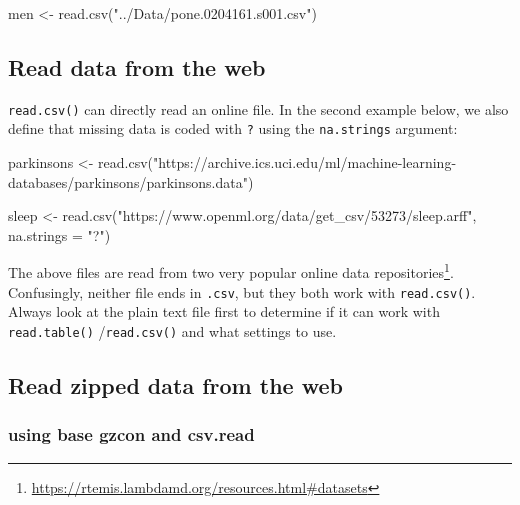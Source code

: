\documentclass[
]{book}
\newenvironment{Shaded}{\begin{snugshade}}{\end{snugshade}}
\newcommand{\AttributeTok}[1]{\textcolor[rgb]{0.77,0.63,0.00}{#1}}
\newcommand{\FunctionTok}[1]{\textcolor[rgb]{0.00,0.00,0.00}{#1}}
\newcommand{\NormalTok}[1]{#1}
\newcommand{\OtherTok}[1]{\textcolor[rgb]{0.56,0.35,0.01}{#1}}
\newcommand{\StringTok}[1]{\textcolor[rgb]{0.31,0.60,0.02}{#1}}
\renewcommand{\href}[2]{#2\footnote{\url{#1}}}
\begin{document}
\begin{Shaded}
\begin{Highlighting}[]
\NormalTok{men }\OtherTok{\textless{}{-}}  \FunctionTok{read.csv}\NormalTok{(}\StringTok{"../Data/pone.0204161.s001.csv"}\NormalTok{)}
\end{Highlighting}
\end{Shaded}

\hypertarget{read-data-from-the-web}{%
\subsection{Read data from the web}\label{read-data-from-the-web}}

\texttt{read.csv()} can directly read an online file. In the second example below, we also define that missing data is coded with \texttt{?} using the \texttt{na.strings} argument:

\begin{Shaded}
\begin{Highlighting}[]
\NormalTok{parkinsons }\OtherTok{\textless{}{-}} \FunctionTok{read.csv}\NormalTok{(}\StringTok{"https://archive.ics.uci.edu/ml/machine{-}learning{-}databases/parkinsons/parkinsons.data"}\NormalTok{)}

\NormalTok{sleep }\OtherTok{\textless{}{-}} \FunctionTok{read.csv}\NormalTok{(}\StringTok{"https://www.openml.org/data/get\_csv/53273/sleep.arff"}\NormalTok{,}
                  \AttributeTok{na.strings =} \StringTok{"?"}\NormalTok{)}
\end{Highlighting}
\end{Shaded}

The above files are read from two very popular online \href{https://rtemis.lambdamd.org/resources.html\#datasets}{data repositories}. Confusingly, neither file ends in \texttt{.csv}, but they both work with \texttt{read.csv()}. Always look at the plain text file first to determine if it can work with \texttt{read.table()} /\texttt{read.csv()} and what settings to use.

\hypertarget{read-zipped-data-from-the-web}{%
\subsection{Read zipped data from the web}\label{read-zipped-data-from-the-web}}

\hypertarget{using-base-gzcon-and-csv.read}{%
\subsubsection{using base gzcon and csv.read}\label{using-base-gzcon-and-csv.read}}
\end{document}
